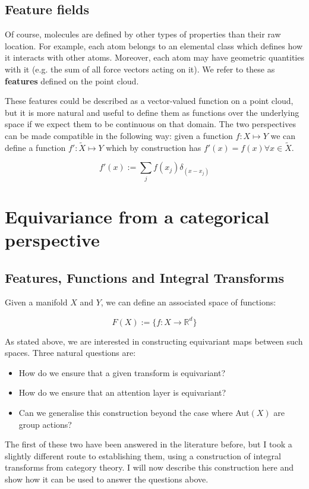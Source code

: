 \documentclass[11pt]{article}
\begin{document}
\subsection{Feature fields}
Of course, molecules are defined by other types of properties than their raw location. For example, each atom belongs to an elemental class which defines how it interacts with other atoms. Moreover, each atom may have geometric quantities with it (e.g. the sum of all force vectors acting on it). We refer to these as \textbf{features} defined on the point cloud.

These features could be described as a vector-valued function on a point cloud, but it is more natural and useful to define them as functions over the underlying space if we expect them to be continuous on that domain. The two perspectives can be made compatible in the following way: given a function $f: X \mapsto Y$ we can define a function $f': \tilde{X} \mapsto Y$ which by construction has $f'(x) = f(x) \forall x \in \tilde{X}$.

$$ f'(x) := \sum_j f(x_j)\delta_(x - x_j)$$

\section{Equivariance from a categorical perspective}

\subsection*{Features, Functions and Integral Transforms}

Given a manifold $X$ and $Y$, we can define an associated space of functions:

$$ F(X) := \{ f: X \rightarrow \mathbb{R}^d \}$$

As stated above, we are interested in constructing equivariant maps between such spaces. Three natural questions are:

\begin{itemize}
    \item How do we ensure that a given transform is equivariant?
    \item How do we ensure that an attention layer is equivariant?
    \item Can we generalise this construction beyond the case where Aut$(X)$ are group actions?
\end{itemize}

The first of these two have been answered in the literature before, but I took a slightly different route to establishing them, using a construction of integral transforms from category theory. I will now describe this construction here and show how it can be used to answer the questions above. %
\end{document}
